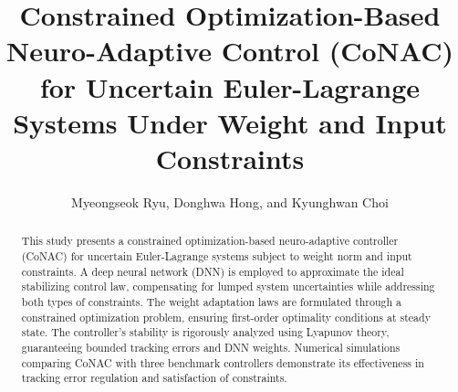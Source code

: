\documentclass[final,5p,times,twocolumn,authoryear]{elsarticle}
\begin{document}
\begin{frontmatter}



\title{
  Constrained Optimization-Based Neuro-Adaptive Control (CoNAC) for Uncertain Euler-Lagrange Systems Under Weight and Input Constraints 
} %


\author{
  Myeongseok Ryu, Donghwa Hong, and Kyunghwan Choi
} %


\begin{abstract}
  This study presents a constrained optimization-based neuro-adaptive controller (CoNAC) for uncertain Euler-Lagrange systems subject to weight norm and input constraints. A deep neural network (DNN) is employed to approximate the ideal stabilizing control law, compensating for lumped system uncertainties while addressing both types of constraints. The weight adaptation laws are formulated through a constrained optimization problem, ensuring first-order optimality conditions at steady state. The controller's stability is rigorously analyzed using Lyapunov theory, guaranteeing bounded tracking errors and DNN weights. Numerical simulations comparing CoNAC with three benchmark controllers demonstrate its effectiveness in tracking error regulation and satisfaction of constraints.
\end{abstract}


\end{frontmatter}
\end{document}
